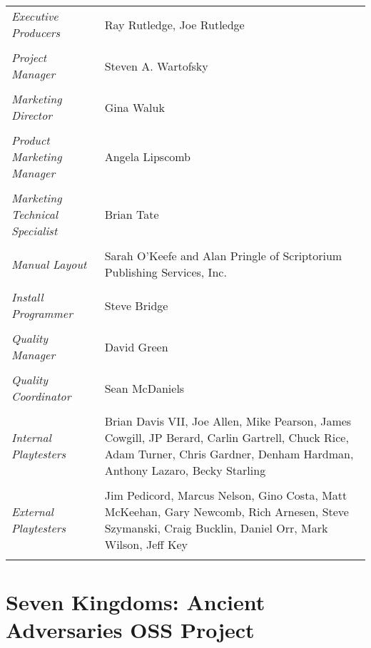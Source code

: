 \begin{tabular}{p{1in} p{3in}}
	\textit{Executive Producers} & Ray Rutledge, Joe Rutledge \\ \\
	\textit{Project Manager} & Steven A. Wartofsky \\ \\
	\textit{Marketing Director} & Gina Waluk \\ \\
	\textit{Product Marketing Manager} & Angela Lipscomb \\ \\
	\textit{Marketing Technical Specialist}	& Brian Tate \\ \\
	\textit{Manual Layout} & Sarah O’Keefe and Alan Pringle of Scriptorium Publishing Services, Inc. \\ \\
	\textit{Install Programmer}	& Steve Bridge \\ \\
	\textit{Quality Manager} & David Green \\ \\
	\textit{Quality Coordinator} & Sean McDaniels \\ \\
	\textit{Internal Playtesters} & Brian Davis VII, Joe Allen, Mike Pearson, James Cowgill, JP Berard, Carlin Gartrell, Chuck Rice, Adam Turner, Chris Gardner, Denham Hardman, Anthony Lazaro, Becky Starling \\ \\
	\textit{External Playtesters} & Jim Pedicord, Marcus Nelson, Gino Costa, Matt McKeehan, Gary Newcomb, Rich Arnesen, Steve Szymanski, Craig Bucklin, Daniel Orr, Mark Wilson, Jeff Key \\ \\
\end{tabular}

\clearpage

\section{Seven Kingdoms: Ancient Adversaries OSS Project}


